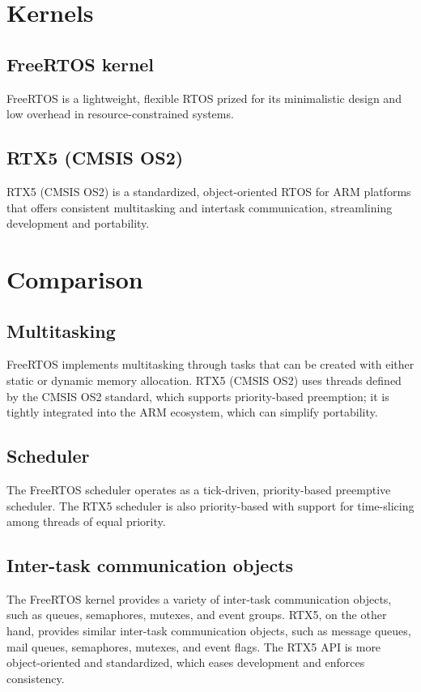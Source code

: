 \section*{Kernels}

\subsection*{FreeRTOS kernel}

FreeRTOS is a lightweight, flexible RTOS prized for its minimalistic design and low overhead in resource-constrained systems.

\subsection*{RTX5 (CMSIS OS2)}

RTX5 (CMSIS OS2) is a standardized, object-oriented RTOS for ARM platforms that offers consistent multitasking and intertask communication, streamlining development and portability.

\section*{Comparison}

\subsection*{Multitasking}

FreeRTOS implements multitasking through tasks that can be created with either static or dynamic memory allocation.
RTX5 (CMSIS OS2) uses threads defined by the CMSIS OS2 standard, which supports priority-based preemption; it is tightly integrated into the ARM ecosystem, which can simplify portability.

\subsection*{Scheduler}

The FreeRTOS scheduler operates as a tick-driven, priority-based preemptive scheduler.
The RTX5 scheduler is also priority-based with support for time-slicing among threads of equal priority.

\subsection*{Inter-task communication objects}

The FreeRTOS kernel provides a variety of inter-task communication objects, such as queues, semaphores, mutexes, and event groups.
RTX5, on the other hand, provides similar inter-task communication objects, such as message queues, mail queues, semaphores, mutexes, and event flags.
The RTX5 API is more object-oriented and standardized, which eases development and enforces consistency.

